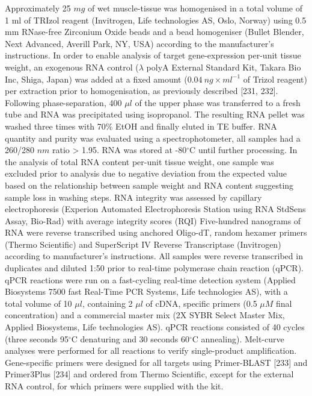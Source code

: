 \documentclass[twoside,10pt]{gihclass} %
\begin{document}
Approximately 25 \(mg\) of wet muscle-tissue was homogenised in a total volume of 1 ml of TRIzol reagent (Invitrogen, Life technologies AS, Oslo, Norway) using 0.5 mm RNase-free Zirconium Oxide beads and a bead homogeniser (Bullet Blender, Next Advanced, Averill Park, NY, USA) according to the manufacturer's instructions.
In order to enable analysis of target gene-expression per-unit tissue weight, an exogenous RNA control (\(\lambda\) polyA External Standard Kit, Takara Bio Inc, Shiga, Japan) was added at a fixed amount (\(0.04 ~ng \times ml^{-1}\) of Trizol reagent) per extraction prior to homogenisation, as previously described
{[}231, 232{]}.
Following phase-separation, 400 \(\mu l\) of the upper phase was transferred to a fresh tube and RNA was precipitated using isopropanol.
The resulting RNA pellet was washed three times with 70\% EtOH and finally eluted in TE buffer.
RNA quantity and purity was evaluated using a spectrophotometer, all samples had a 260/280 \(nm\) ratio \textgreater{} 1.95. RNA was stored at -80\(^{\circ}\)C until further processing. In the analysis of total RNA content per-unit tissue weight, one sample was excluded prior to analysis due to negative deviation from the expected value based on the relationship between sample weight and RNA content suggesting sample loss in washing steps.
RNA integrity was assessed by capillary electrophoresis (Experion Automated Electrophoresis Station using RNA StdSens Assay, Bio-Rad) with average integrity scores (RQI)
Five-hundred nanograms of RNA were reverse transcribed using anchored Oligo-dT, random hexamer primers (Thermo Scientific) and SuperScript IV Reverse Transcriptase (Invitrogen) according to manufacturer's instructions.
All samples were reverse transcribed in duplicates and diluted 1:50 prior to real-time polymerase chain reaction (qPCR).
qPCR reactions were run on a fast-cycling real-time detection system (Applied Biosystems 7500 fast Real-Time PCR Systems, Life technologies AS), with a total volume of 10 \(\mu l\), containing 2 \(\mu l\) of cDNA, specific primers (0.5 \(\mu M\) final concentration) and a commercial master mix (2X SYBR Select Master Mix, Applied Biosystems, Life technologies AS). qPCR reactions consisted of 40 cycles (three seconds 95\(^{\circ}\)C denaturing and 30 seconds 60\(^{\circ}\)C annealing).
Melt-curve analyses were performed for all reactions to verify single-product amplification. Gene-specific primers were designed for all targets using Primer-BLAST {[}233{]} and Primer3Plus {[}234{]} and ordered from Thermo Scientific, except for the external RNA control, for which primers were supplied with the kit.
\end{document}
